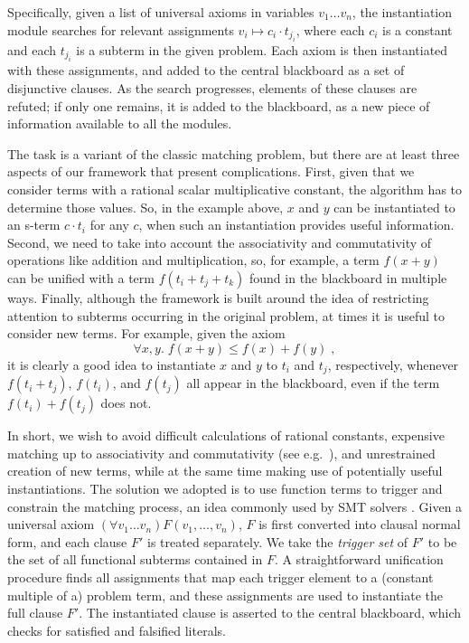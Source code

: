 \documentclass[runningheds]{llncs}
\begin{document}
Specifically, given a list of universal axioms in variables $v_1\ldots
v_n$, the instantiation module searches for relevant assignments $v_i \mapsto c_i \cdot t_{j_i}$, where each $c_i$ is a constant and each $t_{j_i}$ is a subterm in the given problem. Each axiom is then instantiated with these assignments, and added to the central blackboard as a set of disjunctive clauses. As the search progresses, elements of these clauses are refuted; if only one remains, it is added to the blackboard, as a new piece of information available to all the modules.

The task is a variant of the classic matching problem, but there are at least three aspects of our framework that present complications. First, given that we consider terms with a rational scalar multiplicative constant, the algorithm has to determine those values. So, in the example above, $x$ and $y$ can be instantiated to an s-term $c \cdot t_i$ for any $c$, when such an instantiation provides useful information. Second, we need to take into account the associativity and commutativity of operations like addition and multiplication, so, for example, a term $f(x + y)$ can be unified with a term $f(t_i + t_j + t_k)$ found in the blackboard in multiple ways. Finally, although the framework is built around the idea of restricting attention to subterms occurring in the original problem, at times it is useful to consider new terms. For example, given the axiom
\[
\forall x, y. \; f(x + y) \le f(x) + f(y) \;,
\]
it is clearly a good idea to instantiate $x$ and $y$ to $t_i$ and
$t_j$, respectively, whenever $f(t_i + t_j)$, $f(t_i)$, and $f(t_j)$
all appear in the blackboard, even if the term $f(t_i) + f(t_j)$ does not.

In short, we wish to avoid difficult calculations of rational constants, expensive matching up to associativity and commutativity (see e.g.~\cite{contejean:04}), and unrestrained creation of new terms, while at the same time making use of potentially useful instantiations.
The solution we adopted is to use function terms to trigger and
constrain the matching process, an idea commonly used by SMT solvers \cite{demoura:bjorner:07} \cite{nelson:oppen:79}. Given a universal axiom $(\forall
v_1\ldots v_n)F(v_1,\ldots, v_n)$, $F$ is first converted into clausal
normal form, and each clause $F'$ is treated separately. We take the \emph{trigger set} of $F'$ to be the set of all functional subterms contained in $F$. A straightforward unification procedure finds all assignments that map each trigger element to a (constant multiple of a) problem term, and these assignments are used to instantiate the full clause $F'$. The instantiated clause is asserted to the central blackboard, which checks for satisfied and falsified literals.
\end{document}
